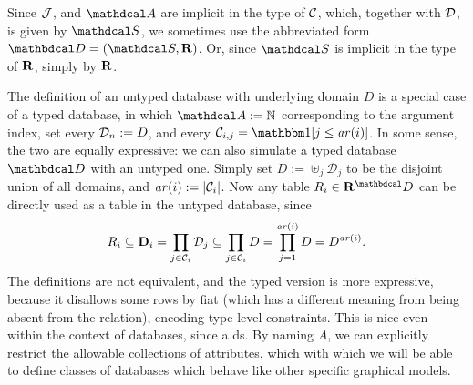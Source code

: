 \documentclass[the-pdg-manual.tex]{subfiles}
\begin{document}
\begin{defn}[database]



	\smallskip
	Since $\mathcal J$, and $\Attrs$ are implicit in the type of $\mathcal C$, which, together with ${\mathcal D}$, is given by $\Sch$, 
	we sometimes use the abbreviated form $\D = (\Sch, \Rels)$.  Or, since $\Sch$ is implicit in the type of ${\mathbf R}$, simply by ${\mathbf R}$.
\end{defn}
\medskip

\begin{inactive}
\begin{remark}\label{rem:typed-db-better}
    The definition of an untyped database with underlying domain $D$ is a special case of a typed database, in which $\Attrs := \mathbb N$ corresponding to the argument index, set every ${\mathcal D}_n := D $, and every $\Cols_{i,j} = \mathbbm1[j \le \arity(i)]$.
    In some sense, the two are equally expressive: we can also simulate a typed database $\D$ with an untyped one. Simply set $D := \uplus_j \mathcal D_j$ to be the disjoint union of all domains, and $\mathit{ar}(i) := |\mathcal C_i|$. Now any table $R_i \in \Rels^\D$ can be directly used as a table in the untyped database, since
    \[R_i \subseteq \mathbf D_i = \prod_{j \in \mathcal C_i} \mathcal D_{j}
		\subseteq \prod_{j \in \mathcal C_i} D = \prod_{j = 1}^{\mathit{ar}(i)} D =
        D^{\mathit{ar}(i)} .\]
  	The definitions are not equivalent, and the typed version is more expressive, because it disallows some rows by fiat (which has a different meaning from being absent from the relation), encoding type-level constraints. This is nice even within the context of databases, since a ds. By naming $A$, we can explicitly restrict the  allowable collections of attributes, which with which we will be able to define classes of databases which behave like other specific graphical models.
\end{remark}
\end{inactive}
\end{document}
